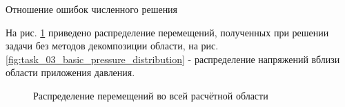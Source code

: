 \documentclass[a4paper]{article}
\begin{document}
\begin{table}[h]
\caption{Отношение ошибок численного решения}
\label{table:task_03_basic_errors_rel}
\end{table}

\newpage

На рис. \ref{fig:task_03_basic_displacement_distribution} приведено распределение перемещений, полученных при решении задачи без методов декомпозиции области, на рис. \ref{fig:task_03_basic_pressure_distribution} - распределение напряжений вблизи области приложения давления.

\begin{figure}[h]
\caption{Распределение перемещений во всей расчётной области}
\label{fig:task_03_basic_displacement_distribution}
\end{figure}
\end{document}
